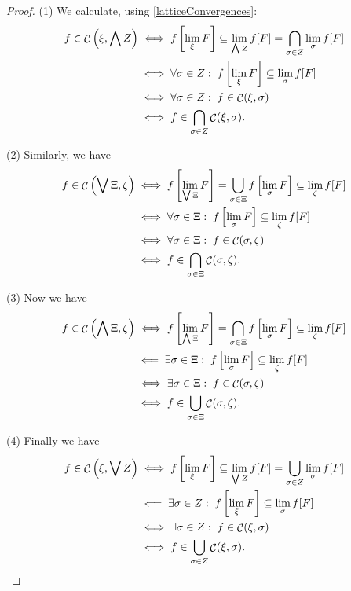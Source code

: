 \begin{proof}
(1) We calculate, using \ref{latticeConvergences}:
\begin{align*}
f \in \mathop{\mathcal{C}}\left(\xi, \bigwedge Z\right) &\iff f\left[\lim_\xi F \right] \subseteq \lim_{\bigwedge Z} f[F] = \bigcap_{\sigma\in Z}\lim_\sigma f[F] \\
&\iff \forall \sigma\in Z: \; f\left[\lim_\xi F \right] \subseteq \lim_\sigma f[F] \\
&\iff \forall \sigma\in Z: \; f \in \mathop{\mathcal{C}}(\xi,\sigma) \\
&\iff f\in \bigcap_{\sigma\in Z}\mathop{\mathcal{C}}(\xi,\sigma).
\end{align*}

(2) Similarly, we have
\begin{align*}
f \in \mathop{\mathcal{C}}\left(\bigvee \Xi, \zeta\right) &\iff f\left[\lim_{\bigvee \Xi} F \right] = \bigcup_{\sigma\in\Xi}f\left[\lim_\sigma F \right] \subseteq \lim_{\zeta} f[F] \\
&\iff \forall \sigma\in \Xi: \; f\left[\lim_\sigma F \right] \subseteq \lim_\zeta f[F] \\
&\iff \forall \sigma\in \Xi: \; f \in \mathop{\mathcal{C}}(\sigma, \zeta) \\
&\iff f\in \bigcap_{\sigma\in \Xi}\mathop{\mathcal{C}}(\sigma, \zeta).
\end{align*}

(3) Now we have
\begin{align*}
f \in \mathop{\mathcal{C}}\left(\bigwedge \Xi, \zeta\right) &\iff f\left[\lim_{\bigwedge \Xi} F \right] = \bigcap_{\sigma\in\Xi}f\left[\lim_\sigma F \right] \subseteq \lim_{\zeta} f[F] \\
&\impliedby \exists \sigma\in \Xi: \; f\left[\lim_\sigma F \right] \subseteq \lim_\zeta f[F] \\
&\iff \exists \sigma\in \Xi: \; f \in \mathop{\mathcal{C}}(\sigma, \zeta) \\
&\iff f\in \bigcup_{\sigma\in \Xi}\mathop{\mathcal{C}}(\sigma, \zeta).
\end{align*}

(4) Finally we have
\begin{align*}
f \in \mathop{\mathcal{C}}\left(\xi, \bigvee Z\right) &\iff f\left[\lim_\xi F \right] \subseteq \lim_{\bigvee Z} f[F] = \bigcup_{\sigma\in Z}\lim_\sigma f[F] \\
&\impliedby \exists \sigma\in Z: \; f\left[\lim_\xi F \right] \subseteq \lim_\sigma f[F] \\
&\iff \exists \sigma\in Z: \; f \in \mathop{\mathcal{C}}(\xi,\sigma) \\
&\iff f\in \bigcup_{\sigma\in Z}\mathop{\mathcal{C}}(\xi,\sigma).
\end{align*}
\end{proof}

